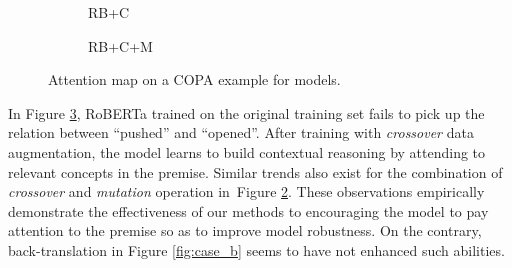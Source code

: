 \documentclass[letterpaper]{article} %
\newcommand{\figref}[1]{Figure \ref{#1}}
\newcommand{\KZ}[1]{\textcolor{blue}{Kenny: #1}}
\begin{document}
\begin{figure}[th!]
\begin{subfigure}[b]{0.20\textwidth}
\caption{RB+C}
\label{fig:case_c}
\end{subfigure}
\hfill
\begin{subfigure}[b]{0.20\textwidth}
\centering
{}
\caption{RB+C+M}
\label{fig:case_cm}
\end{subfigure}
\caption{Attention map on a COPA example for models.}
\label{fig:case}
\end{figure}


In \figref{fig:case}, 
RoBERTa trained on the original training set fails to pick up the 
relation between ``pushed'' and ``opened''. 
After training with \textit{crossover} data augmentation, 
the model learns to build contextual reasoning  
by attending to relevant concepts in the premise. 
Similar trends also exist for the combination of \textit{crossover} 
and \textit{mutation} operation in~\figref{fig:case_cm}. 
These observations empirically demonstrate the effectiveness of our methods 
to encouraging the model to pay attention to the premise so as to improve 
model robustness. On the contrary, back-translation in \figref{fig:case_b} seems 
to have not enhanced such abilities.
\end{document}
